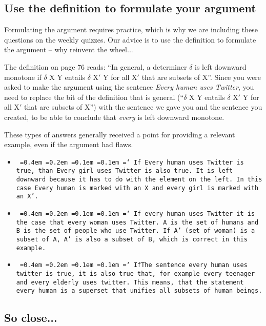 \documentclass[a4,11pt]{article}
\newcommand*\justify{%
  \fontdimen2\font=0.4em%
  \fontdimen3\font=0.2em%
  \fontdimen4\font=0.1em%
  \fontdimen7\font=0.1em%
  \hyphenchar\font=`\-%
}
\begin{document}
\subsection*{Use the definition to formulate your argument}

Formulating the argument requires practice, which is why we are including these questions on the weekly quizzes. Our advice is to use the definition to formulate the argument -- why reinvent the wheel...

The definition on page 76 reads:  ``In general, a determiner $\delta$ is left downward monotone if $\delta$ X Y entails $\delta$ X$'$ Y for all X$'$ that are subsets of X''. Since you were asked to make the argument using the sentence {\em Every human uses Twitter}, you need to replace the bit of the definition that is general (``$\delta$ X Y entails $\delta$ X$'$ Y for all X$'$ that are subsets of X'') with the sentence we gave you and the sentence you created, to be able to conclude that {\em every} is left downward monotone. 

These types of answers generally received a point for providing a relevant example, even if the argument had flaws.

\begin{itemize}[leftmargin = 12pt]

\item \texttt{\justify If Every human uses Twitter is true, than Every girl uses Twitter is also true. It is left downward because it has to do with the element on the left. In this case Every human is marked with an X and every girl is marked with an X'.}


\item \texttt{\justify If every human uses Twitter it is the case that every woman uses Twitter.
A is the set of humans and B is the set of people who use Twitter. If A' (set of woman) is a subset of A, A' is also a subset of B, which is correct in this example.}

\item \texttt{\justify IfThe sentence every human uses twitter is true, it is also true that, for example every teenager and every elderly uses twitter. This means, that the statement every human is a superset that unifies all subsets of human beings.}

\end{itemize}

\subsection*{So close...}
\end{document}
